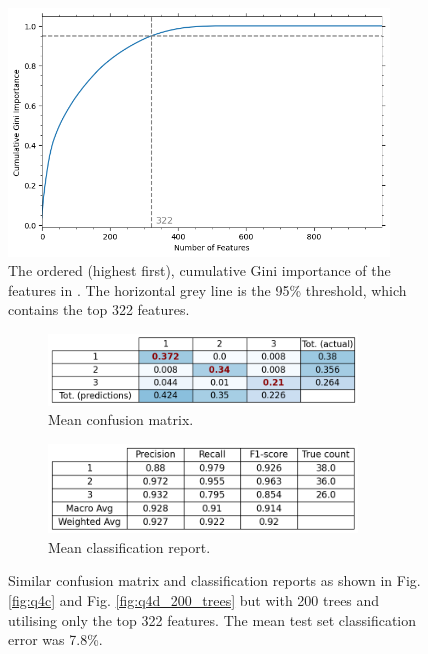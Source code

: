     \begin{figure}[htb]
    \centering
    \includegraphics[width=0.9\textwidth]{./figures/q4e_gini_importance}
    \caption{The ordered (highest first), cumulative Gini importance of the features in
        . The horizontal grey line is the 95\% threshold, which contains the top
        322 features.}
        \label{fig:q4e_gini_importance}
    \end{figure}

    \begin{figure}[htb]
    \centering
    \begin{subfigure}{0.5\textwidth}
        \centering
        \includegraphics[width=0.9\textwidth]{./figures/q4e_confusion_matrix}
        \caption{Mean confusion matrix.}
        \label{fig:q4e_confusion_matrix}
    \end{subfigure}%
    \begin{subfigure}{0.5\textwidth}
        \centering
        \includegraphics[width=0.9\textwidth]{./figures/q4e_classification_report}
        \caption{Mean classification report.}
        \label{fig:q4e_classification_report}
    \end{subfigure}
    \caption{Similar confusion matrix and classification reports as shown in Fig. \eqref{fig:q4c} and Fig. \eqref{fig:q4d_200_trees}
        but with 200 trees and utilising only the top 322 features. The mean test set classification error was 7.8\%.}
    \label{fig:q4e}
    \end{figure}

